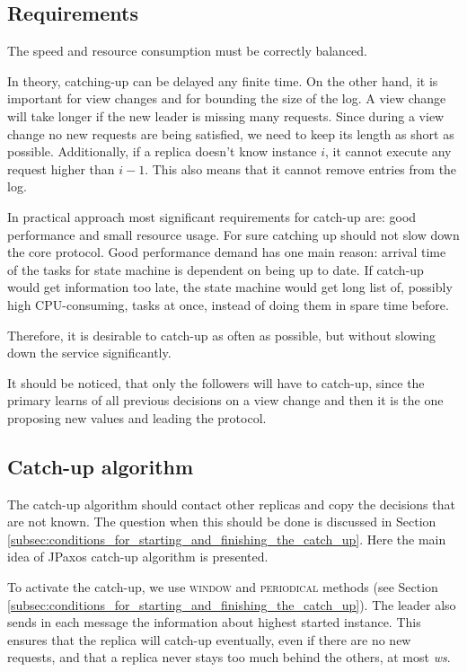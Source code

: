 \subsection{Requirements}
\label{subsec:catch_up_requirements}
The speed and resource consumption must be correctly balanced.

In theory, catching-up can be delayed any finite time. On the other hand, it is important for view changes and for bounding the size of the log. A view change will take longer if the new leader is missing many requests. Since during a view change no new requests are being satisfied, we need to keep its length as short as possible. Additionally, if a replica doesn't know instance $i$, it cannot execute any request higher than $i-1$. This also means that it cannot remove entries from the log.

In practical approach most significant requirements for catch-up are: good performance and small resource usage. For sure catching up should not slow down the core protocol.
Good performance demand has one main reason: arrival time of the tasks for state machine is dependent on being up to date. If catch-up would get information too late, the state machine would get long list of, possibly high CPU-consuming, tasks at once, instead of doing them in spare time before.

Therefore, it is desirable to catch-up as often as possible, but without slowing down the service significantly.

It should be noticed, that only the followers will have to catch-up, since the primary learns of all previous decisions on a view change and then it is the one proposing new values and leading the protocol.

\subsection{Catch-up algorithm}
\label{subsec:catch_up_algorithm}
The catch-up algorithm should contact other replicas and copy the decisions that are not known. The question when this should be done is discussed in Section \ref{subsec:conditions_for_starting_and_finishing_the_catch_up}. Here the main idea of JPaxos catch-up algorithm is presented.

To activate the catch-up, we use \textsc{window} and \textsc{periodical} methods (see Section \ref{subsec:conditions_for_starting_and_finishing_the_catch_up}). The leader also sends in each \alive message the information about highest started instance.
This ensures that the replica will catch-up eventually, even if there are no new requests, and that a replica never stays too much behind the others, at most \textit{ws}.

